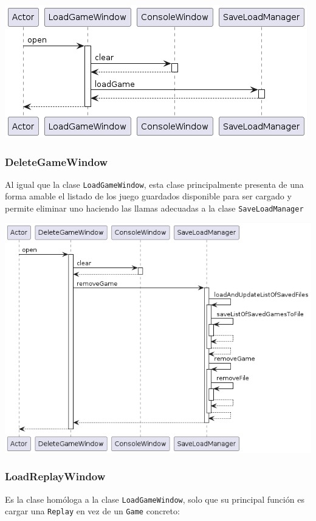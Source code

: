 \documentclass[../DocumentoOficial.tex]{subfiles}
\begin{document}
\begin{center}
\includegraphics[scale=0.5]{LoadGameWindow_final_seq}
\end{center}

\subsubsection{DeleteGameWindow}
Al igual que la clase \texttt{LoadGameWindow}, esta clase principalmente presenta de una forma amable el listado de los juego guardados disponible para ser cargado y permite eliminar uno haciendo las llamas adecuadas a la clase \texttt{SaveLoadManager}

\begin{center}
\includegraphics[scale=0.5]{DeleteGameWindow_final_seq}
\end{center}

\newpage

\subsubsection{LoadReplayWindow}
Es la clase homóloga a la clase \texttt{LoadGameWindow}, solo que su principal función es cargar una \texttt{Replay} en vez de un \texttt{Game} concreto:
\end{document}
